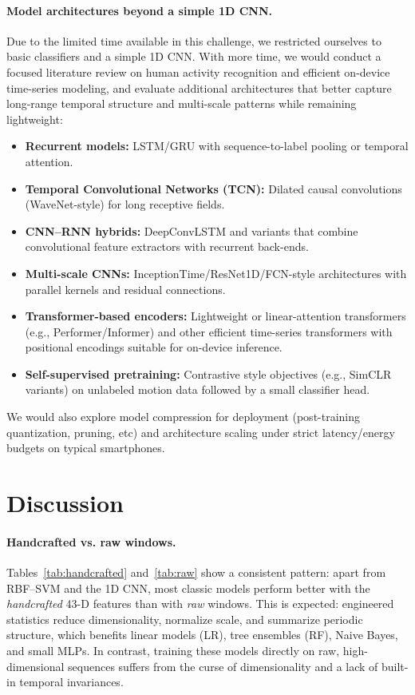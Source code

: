 \documentclass[10pt,twocolumn]{article}
\begin{document}
\paragraph{Model architectures beyond a simple 1D CNN.}
Due to the limited time available in this challenge, we restricted ourselves to basic classifiers and a simple 1D CNN. With more time, we would conduct a focused literature review on human activity recognition and efficient on-device time-series modeling, and evaluate additional architectures that better capture long-range temporal structure and multi-scale patterns while remaining lightweight:
\begin{itemize}
  \item \textbf{Recurrent models:} LSTM/GRU with sequence-to-label pooling or temporal attention.
  \item \textbf{Temporal Convolutional Networks (TCN):} Dilated causal convolutions (WaveNet-style) for long receptive fields.
  \item \textbf{CNN--RNN hybrids:} DeepConvLSTM and variants that combine convolutional feature extractors with recurrent back-ends.
  \item \textbf{Multi-scale CNNs:} InceptionTime/ResNet1D/FCN-style architectures with parallel kernels and residual connections.
  \item \textbf{Transformer-based encoders:} Lightweight or linear-attention transformers (e.g., Performer/Informer) and other efficient time-series transformers with positional encodings suitable for on-device inference.
  \item \textbf{Self-supervised pretraining:} Contrastive style objectives (e.g., SimCLR variants) on unlabeled motion data followed by a small classifier head.
\end{itemize}
We would also explore model compression for deployment (post-training quantization, pruning, etc) and architecture scaling under strict latency/energy budgets on typical smartphones.




\section{Discussion}
\label{sec:discussion}

\paragraph{Handcrafted vs. raw windows.}
Tables~\ref{tab:handcrafted} and~\ref{tab:raw} show a consistent pattern: apart from RBF--SVM and the 1D CNN, most classic models perform better with the \emph{handcrafted} 43-D features than with \emph{raw} windows. This is expected: engineered statistics reduce dimensionality, normalize scale, and summarize periodic structure, which benefits linear models (LR), tree ensembles (RF), Naive Bayes, and small MLPs. In contrast, training these models directly on raw, high-dimensional sequences suffers from the curse of dimensionality and a lack of built-in temporal invariances.
\end{document}
